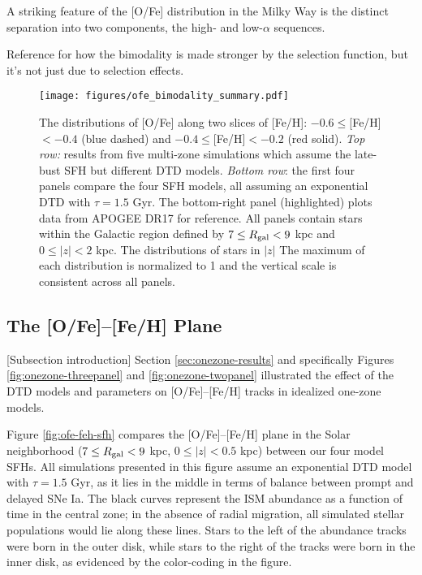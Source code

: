 \documentclass[twocolumn,twocolappendix,linenumbers,trackchanges]{aastex631}
\begin{document}
A striking feature of the [O/Fe] distribution in the Milky Way is the distinct separation into two components, the high- and low-$\alpha$ sequences. 

Reference \citet{Vincenzo2021-AlphaDistribution} for how the bimodality is made stronger by the selection function, but it's not just due to selection effects.

\begin{figure*}
    \centering
    \texttt{[image: figures/ofe\_bimodality\_summary.pdf]}
    \caption{The distributions of [O/Fe] along two slices of [Fe/H]: $-0.6\leq$[Fe/H]$<-0.4$ (blue dashed) and $-0.4\leq$[Fe/H]$<-0.2$ (red solid). \textit{Top row:} results from five multi-zone simulations which assume the late-bust SFH but different DTD models. \textit{Bottom row}: the first four panels compare the four SFH models, all assuming an exponential DTD with $\tau=1.5$ Gyr. The bottom-right panel (highlighted) plots data from APOGEE DR17 for reference. All panels contain stars within the Galactic region defined by $7\leq R_{\rm gal}<9$ kpc and $0\leq|z|<2$ kpc. The distributions of stars in $|z|$ The maximum of each distribution is normalized to 1 and the vertical scale is consistent across all panels.}
    \label{fig:ofe-bimodality}
\end{figure*}

\subsection{The [O/Fe]--[Fe/H] Plane}
\label{sec:ofe-feh}

[Subsection introduction]
Section \ref{sec:onezone-results} and specifically Figures \ref{fig:onezone-threepanel} and \ref{fig:onezone-twopanel} illustrated the effect of the DTD models and parameters on [O/Fe]--[Fe/H] tracks in idealized one-zone models.

Figure \ref{fig:ofe-feh-sfh} compares the [O/Fe]--[Fe/H] plane in the Solar neighborhood ($7\leq R_{\rm gal}<9$ kpc, $0\leq|z|<0.5$ kpc) between our four model SFHs. All simulations presented in this figure assume an exponential DTD model with $\tau=1.5$ Gyr, as it lies in the middle in terms of balance between prompt and delayed SNe Ia. The black curves represent the ISM abundance as a function of time in the central zone; in the absence of radial migration, all simulated stellar populations would lie along these lines. Stars to the left of the abundance tracks were born in the outer disk, while stars to the right of the tracks were born in the inner disk, as evidenced by the color-coding in the figure.
\end{document}
